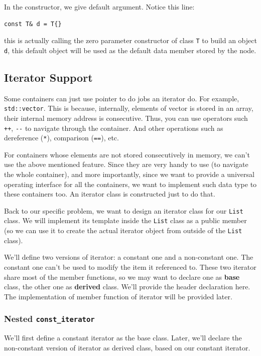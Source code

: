 \documentclass[12pt]{book}
\begin{document}
In the constructor, we give default argument. Notice this line:
\begin{verbatim}
const T& d = T{}
\end{verbatim}
this is actually calling the zero parameter constructor of class \texttt{T} to build an object \texttt{d}, this default object will be used as the default data member stored by the node.
\subsection{Iterator Support}
\label{sec:org5843aeb}
Some containers can just use pointer to do jobs an iterator do. For example, \texttt{std::vector}. This is because, internally, elements of vector is stored in an array, their internal memory address is consecutive. Thus, you can use operators such \texttt{++}, \texttt{-{}-} to navigate through the container. And other operations such as dereference (\texttt{*}), comparison (\texttt{==}), etc.

For containers whose elements are not stored consecutively in memory, we can't use the above mentioned feature. Since they are very handy to use (to navigate the whole container), and more importantly, since we want to provide a universal operating interface for all the containers, we want to implement such data type to these containers too. An iterator class is constructed just to do that.

Back to our specific problem, we want to design an iterator class for our \texttt{List} class. We will implement its template inside the \texttt{List} class as a public member (so we can use it to create the actual iterator object from outside of the \texttt{List} class).

We'll define two versions of iterator: a constant one and a non-constant one. The constant one can't be used to modify the item it referenced to. These two iterator share most of the member functions, so we may want to declare one as \textbf{base} class, the other one as \textbf{derived} class. We'll provide the header declaration here. The implementation of member function of iterator will be provided later.
\subsubsection{Nested \texttt{const\_iterator}}
\label{sec:org0ce4897}
We'll first define a constant iterator as the base class. Later, we'll declare the non-constant version of iterator as derived class, based on our constant iterator.
\end{document}
